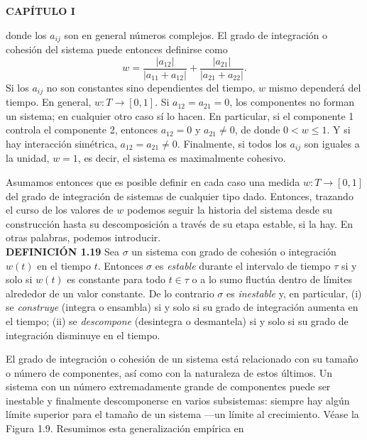 \newpage
\fancyhf{}
\fancyhead[l]{\thepage}
\begin{center}
{\fontsize{13}{16}\selectfont \textbf{CAPÍTULO I}}
\end{center}
\vspace{0.5cm}

{\fontsize{13}{15}\selectfont
donde los \( a_{ij} \) son en general números complejos. El grado de integración o cohesión del sistema puede entonces definirse como
\[w = \frac{|a_{12}|}{|a_{11} + a_{12}|} + \frac{|a_{21}|}{|a_{21} + a_{22}|}.\]
Si los \( a_{ij} \) no son constantes sino dependientes del tiempo, \( w \) mismo dependerá del tiempo. En general, \( w: T \rightarrow [0, 1] \).
Si \( a_{12} = a_{21} = 0 \), los componentes no forman un sistema; en cualquier otro caso sí lo hacen. En particular, si el componente 1 controla el componente 2, entonces \( a_{12} = 0 \) y \( a_{21} \neq 0 \), de donde \( 0 < w \leq 1 \). Y si hay interacción simétrica, \( a_{12} = a_{21} \neq 0 \). Finalmente, si todos los \( a_{ij} \) son iguales a la unidad, \( w = 1 \), es decir, el sistema es maximalmente cohesivo.

Asumamos entonces que es posible definir en cada caso una medida \( w: T \rightarrow [0, 1] \) del grado de integración de sistemas de cualquier tipo dado. Entonces, 
trazando el curso de los valores de \( w \) podemos seguir la historia del sistema desde su construcción hasta su descomposición a través de su etapa estable, si la hay. En otras palabras, podemos introducir. \\

\textbf{DEFINICIÓN 1.19} Sea \( \sigma \) un sistema con grado de cohesión o integración \( w(t) \) en el tiempo \( t \). Entonces \( \sigma \) es \textit{estable} durante el intervalo de tiempo \( \tau \) si y solo si \( w(t) \) es constante para todo \( t \in \tau \) o a lo sumo fluctúa dentro de límites alrededor de un valor constante. De lo contrario \( \sigma \) es \textit{inestable} y, en particular,
(i) se \textit{construye} (integra o ensambla) si y solo si su grado de integración aumenta en el tiempo;
(ii) se \textit{descompone} (desintegra o desmantela) si y solo si su grado de integración disminuye en el tiempo.

El grado de integración o cohesión de un sistema está relacionado con su tamaño o número de componentes, así como con la naturaleza de estos últimos. 
Un sistema con un número extremadamente grande de componentes puede ser inestable y finalmente descomponerse en varios subsistemas: siempre hay algún límite superior para el tamaño de un sistema —un límite al crecimiento. Véase la Figura 1.9. 
Resumimos esta generalización empírica en\\

}
